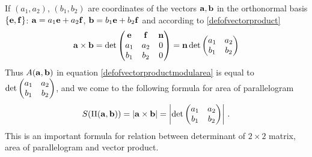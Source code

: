 \documentclass[12pt]{article}
\numberwithin{equation}{section}
\begin{document}
   If $(a_1,a_2)$, $(b_1,b_2)$ are coordinates 
of the vectors ${\bf a},{\bf b}$ in the orthonormal basis $\{{\bf e},{\bf f}\}$:
   ${\bf a}=a_1{\bf e}+a_2{\bf f}$, ${\bf b}=b_1{\bf e}+b_2{\bf f}$ and according to 
\eqref{defofvectorproduct}
                  \begin{equation}\label{defofvectorproduct5}
            {\bf a}\times {\bf b}=\det \begin{pmatrix}
                {\bf e}  &{\bf f}  &{\bf n} \cr
                  a_1   & a_2  &0 \cr
                  b_1   & b_2  &0\cr
                  \end{pmatrix}={\bf n}\det\begin{pmatrix}
                  a_1   & a_2 \cr
                  b_1   & b_2 \cr
                  \end{pmatrix}
                  \end{equation}
Thus $A({\bf a},{\bf b})$ in equation \eqref{defofvectorproductmodularea} 
is equal to  $\det\begin{pmatrix}
                  a_1   & a_2 \cr
                  b_1   & b_2 \cr
                  \end{pmatrix}$,
and we come to the following formula
for area of parallelogram
       \begin{equation}\label{areaoftwodimeparal1}
   S(\Pi({\bf a},{\bf b}))=|{\bf a}\times{\bf b}|=
                    \left|
              \det\begin{pmatrix}
                  a_1   & a_2 \cr
                  b_1   & b_2 \cr
                  \end{pmatrix}
                  \right|\,.
\end{equation}
This is  an important formula
 for relation between determinant of $2\times 2$ matrix, 
area of parallelogram and vector product.

\m
\end{document}
